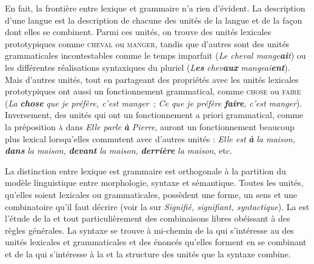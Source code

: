 En fait, la frontière entre lexique et grammaire n’a rien d’évident. La description d’une langue est la description de chacune des unités de la langue et de la façon dont elles se combinent. Parmi ces unités, on trouve des unités lexicales prototypiques comme \textsc{cheval} ou \textsc{manger}, tandis que d’autres sont des unités grammaticales incontestables comme le temps imparfait (\textit{Le cheval mange}\textbf{\textit{ai}}\textit{t}) ou les différentes réalisations syntaxiques du pluriel (\textit{L}\textbf{\textit{es}} \textit{chev}\textbf{\textit{aux}} \textit{mangeai}\textbf{\textit{ent}}). Mais d’autres unités, tout en partageant des propriétés avec les unités lexicales prototypiques ont aussi un fonctionnement grammatical, comme \textsc{chose} ou \textsc{faire} (\textit{La} \textbf{\textit{chose}} \textit{que je préfère, c’est manger~}; \textit{Ce que je préfère} \textbf{\textit{faire}}, \textit{c’est manger}). Inversement, des unités qui ont un fonctionnement a priori grammatical, comme la préposition \textsc{à} dans \textit{Elle parle} \textbf{\textit{à}} \textit{Pierre}, auront un fonctionnement beaucoup plus lexical lorsqu’elles commutent avec d’autres unités : \textit{Elle est} \textbf{\textit{à}} \textit{la maison,} \textbf{\textit{dans}} \textit{la maison,} \textbf{\textit{devant}} \textit{la maison,} \textbf{\textit{derrière}} \textit{la maison}, etc.

La distinction entre lexique est grammaire est orthogonale à la partition du modèle linguistique entre morphologie, syntaxe et sémantique. Toutes les unités, qu’elles soient lexicales ou grammaticales, possèdent une forme, un sens et une combinatoire qu’il faut décrire (voir la  sur \textit{Signifié, signifiant, syntactique}). La  est l’étude de la  et tout particulièrement des combinaisons libres obéissant à des règles générales. La syntaxe se trouve à mi-chemin de la  qui s’intéresse au  des unités lexicales et grammaticales et des énoncés qu’elles forment en se combinant et de la  qui s’intéresse à la  et la structure des unités que la syntaxe combine.



